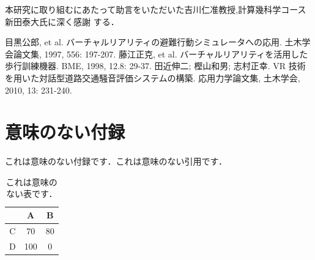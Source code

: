 \documentclass[dvipdfmx]{ampbt}
\def\numberofspines{1}
\begin{document}
\acknowledgment
本研究に取り組むにあたって助言をいただいた吉川仁准教授,計算幾科学コース新田泰大氏に深く感謝
する．

\begin{thebibliography}{10}
目黒公郎, et al. バーチャルリアリティの避難行動シミュレータへの応用. 土木学会論文集, 1997, 556: 197-207.
藤江正克, et al. バーチャルリアリティを活用した歩行訓練機器. BME, 1998, 12.8: 29-37.
田近伸二; 樫山和男; 志村正幸. VR 技術を用いた対話型道路交通騒音評価システムの構築. 応用力学論文集, 土木学会, 2010, 13: 231-240.
\end{thebibliography}

\appendix

\section{意味のない付録}
これは意味のない付録です．これは意味のない引用です\cite{polya1945}．

\begin{table}[htbp]
  \caption{これは意味のない表です．}
  \centering
  \begin{tabular}{c|cc}
      &  A  &  B \\
    \hline
    C &  70 & 80 \\
    D & 100 &  0
  \end{tabular}
\end{table}

\fi
\ifoutputcover
\cleardoublepage
\makecover                      %
\makespine[\numberofspines]     %
\fi
\ifoutputabstractforsubmission
\makeabstractforsubmission      %
\fi
\end{document}
